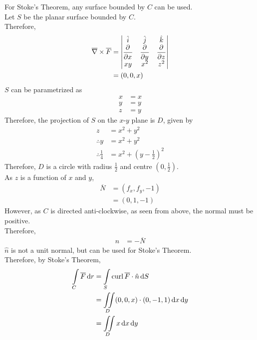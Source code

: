 \documentclass[fleqn, a4paper, 12pt, twoside]{article}
\theoremstyle{definition}
\theoremstyle{theorem}
\newcommand{\curl}{\mathrm{curl\,}}
\begin{document}
\begin{solution}
	For Stoke's Theorem, any surface bounded by $C$ can be used.\\
	Let $S$ be the planar surface bounded by $C$.\\
	Therefore,
	\begin{align*}
		\overline{\nabla} \times \overline{F} &=
			\begin{vmatrix}
				\hat{i} & \hat{j} & \hat{k}\\
				\dpd{}{x} & \dpd{}{y} & \dpd{}{z}\\
				x y & x^2 & z^2\\
			\end{vmatrix}\\
		                                      &= (0,0,x)
	\end{align*}
	$S$ can be parametrized as
	\begin{align*}
		x &= x\\
		y &= y\\
		z &= y
	\end{align*}
	Therefore, the projection of $S$ on the $x$-$y$ plane is $D$, given by
	\begin{align*}
		z &= x^2 + y^2\\
		\therefore y &= x^2 + y^2\\
		\therefore \frac{1}{4} &= x^2 + \left( y - \frac{1}{2} \right)^2
	\end{align*}
	Therefore, $D$ is a circle with radius $\frac{1}{2}$ and centre $\left( 0 , \frac{1}{2} \right)$.\\
	As $z$ is a function of $x$ and $y$,
	\begin{align*}
		\overline{N} &= (f_x , f_y , -1)\\
		&= (0,1,-1)
	\end{align*}
	However, as $C$ is directed anti-clockwise, as seen from above, the normal must be positive.\\
	Therefore,
	\begin{align*}
		\hat{n} &= -\overline{N}
	\end{align*}
	$\hat{n}$ is not a unit normal, but can be used for Stoke's Theorem.\\
	Therefore, by Stoke's Theorem,
	\begin{align*}
		\int\limits_{C} \overline{F} \dif r &= \int\limits_{S} \curl \overline{F} \cdot \hat{n} \dif S\\
		&= \iint\limits_{D} (0,0,x) \cdot (0,-1,1) \dif x \dif y\\
		&= \iint\limits_{D} x \dif x \dif y

\end{align*}
\end{solution}
\end{document}
